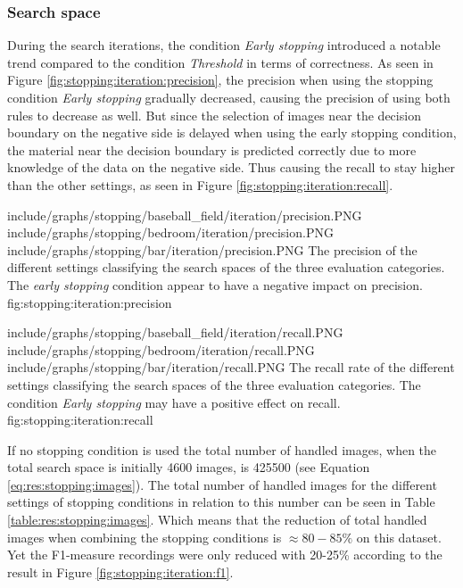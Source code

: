\subsubsection{Search space}
\label{sec:result:stopping:iterations}
During the search iterations, the condition \emph{Early stopping} introduced a notable trend compared to the condition \emph{Threshold} in terms of correctness. As seen in Figure \ref{fig:stopping:iteration:precision}, the precision when using the stopping condition \emph{Early stopping} gradually decreased, causing the precision of using both rules to decrease as well. But since the selection of images near the decision boundary on the negative side is delayed when using the early stopping condition, the material near the decision boundary is predicted correctly due to more knowledge of the data on the negative side. Thus causing the recall to stay higher than the other settings, as seen in Figure \ref{fig:stopping:iteration:recall}.

\tripfigurenear
{include/graphs/stopping/baseball_field/iteration/precision.PNG}
{include/graphs/stopping/bedroom/iteration/precision.PNG}
{include/graphs/stopping/bar/iteration/precision.PNG}
{The precision of the different settings classifying the search spaces of the three evaluation categories. The \emph{early stopping} condition appear to have a negative impact on precision.}
{fig:stopping:iteration:precision}

\tripfigurenear
{include/graphs/stopping/baseball_field/iteration/recall.PNG}
{include/graphs/stopping/bedroom/iteration/recall.PNG}
{include/graphs/stopping/bar/iteration/recall.PNG}
{The recall rate of the different settings classifying the search spaces of the three evaluation categories. The condition \emph{Early stopping} may have a positive effect on recall.}
{fig:stopping:iteration:recall}

If no stopping condition is used the total number of handled images, when the total search space is initially 4600 images, is 425500 (see Equation \ref{eq:res:stopping:images}). The total number of handled images for the different settings of stopping conditions in relation to this number can be seen in Table \ref{table:res:stopping:images}. Which means that the reduction of total handled images when combining the stopping conditions is $\approx80-85\%$ on this dataset. Yet the F1-measure recordings were only reduced with 20-25\% according to the result in Figure \ref{fig:stopping:iteration:f1}. 

